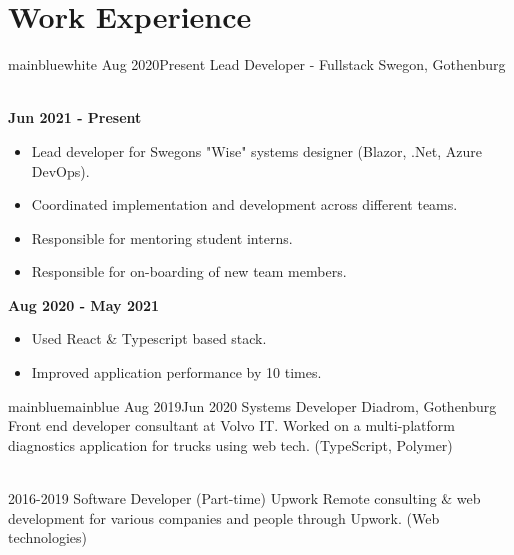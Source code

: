 \documentclass[a4paper]{twentysecondcv} %
\begin{document}
\section{Work Experience}
\begin{twenty} %
    \twentyitemtime
    {mainblue}{white}
    {Aug 2020}{Present}
    {Lead Developer - Fullstack}
    {Swegon, Gothenburg}
    {
    \\
    \textbf{Jun 2021 - Present}
    \begin{itemize}
        \setlength\itemsep{.5em}
        \item Lead developer for Swegons "Wise" systems designer (Blazor, .Net, Azure DevOps).
        \item Coordinated implementation and development across different teams.
        \item Responsible for mentoring student interns.
        \item Responsible for on-boarding of new team members.
    \end{itemize}
    
    \vspace{1em}
    
    \textbf{Aug 2020 - May 2021}
    \begin{itemize}
        \setlength\itemsep{.5em}
        \item Used React \& Typescript based stack.
        \item Improved application performance by 10 times.
    \end{itemize}
    }
    
    \vspace{.5em}
    
    \twentyitemtime
    {mainblue}{mainblue}
    {Aug 2019}{Jun 2020}
    {Systems Developer}
    {Diadrom, Gothenburg}
    {Front end developer consultant at Volvo IT. Worked on a multi-platform diagnostics application for trucks using web tech. (TypeScript, Polymer)}
    
    \\
    
    \twentyitem
    {2016-2019}
    {Software Developer (Part-time)}
    {Upwork}
    {Remote consulting \& web development for various companies and people through Upwork. (Web technologies)}
    
\end{twenty}
\end{document}
